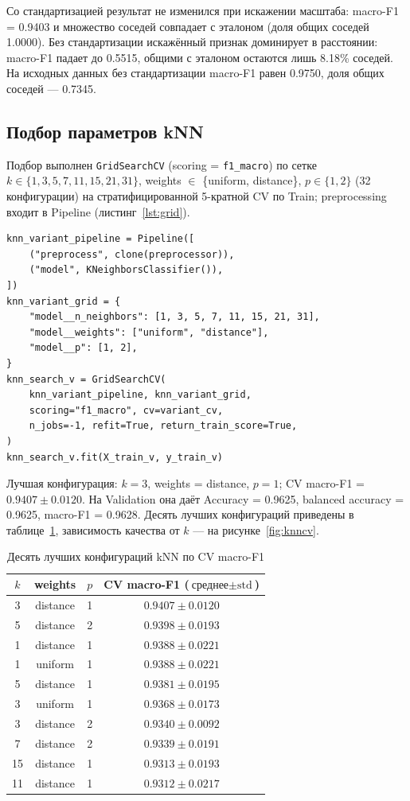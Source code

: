 \documentclass[14pt,a4paper]{extarticle}
\newcommand{\sd}{\ensuremath{\pm}}
\begin{document}
Со стандартизацией результат не изменился при искажении масштаба: macro-F1 = 0.9403 и множество соседей совпадает с эталоном (доля общих соседей 1.0000). Без стандартизации искажённый признак доминирует в расстоянии: macro-F1 падает до 0.5515, общими с эталоном остаются лишь 8.18\% соседей. На исходных данных без стандартизации macro-F1 равен 0.9750, доля общих соседей --- 0.7345.

\subsection{Подбор параметров kNN}

Подбор выполнен \texttt{GridSearchCV} (scoring = \texttt{f1\_macro}) по сетке $k\in\{1,3,5,7,11,15,21,31\}$, weights $\in$ \{uniform, distance\}, $p\in\{1,2\}$ (32 конфигурации) на стратифицированной 5-кратной CV по Train; preprocessing входит в Pipeline (листинг~\ref{lst:grid}).

\begin{lstlisting}[caption={Подбор параметров kNN в Pipeline},label={lst:grid}]
knn_variant_pipeline = Pipeline([
    ("preprocess", clone(preprocessor)),
    ("model", KNeighborsClassifier()),
])
knn_variant_grid = {
    "model__n_neighbors": [1, 3, 5, 7, 11, 15, 21, 31],
    "model__weights": ["uniform", "distance"],
    "model__p": [1, 2],
}
knn_search_v = GridSearchCV(
    knn_variant_pipeline, knn_variant_grid,
    scoring="f1_macro", cv=variant_cv,
    n_jobs=-1, refit=True, return_train_score=True,
)
knn_search_v.fit(X_train_v, y_train_v)
\end{lstlisting}

Лучшая конфигурация: $k=3$, weights = distance, $p=1$; CV macro-F1 = $0.9407\sd 0.0120$. На Validation она даёт Accuracy = 0.9625, balanced accuracy = 0.9625, macro-F1 = 0.9628. Десять лучших конфигураций приведены в таблице~\ref{tab:knn}, зависимость качества от $k$ --- на рисунке~\ref{fig:knncv}.

\begin{table}[h!]
\centering
\begin{tabular}{cccc}
\toprule
$k$ & weights & $p$ & CV macro-F1 ($\text{среднее}\sd\text{std}$) \\
\midrule
3  & distance & 1 & $0.9407\sd 0.0120$ \\
5  & distance & 2 & $0.9398\sd 0.0193$ \\
1  & distance & 1 & $0.9388\sd 0.0221$ \\
1  & uniform  & 1 & $0.9388\sd 0.0221$ \\
5  & distance & 1 & $0.9381\sd 0.0195$ \\
3  & uniform  & 1 & $0.9368\sd 0.0173$ \\
3  & distance & 2 & $0.9340\sd 0.0092$ \\
7  & distance & 2 & $0.9339\sd 0.0191$ \\
15 & distance & 1 & $0.9313\sd 0.0193$ \\
11 & distance & 1 & $0.9312\sd 0.0217$ \\
\bottomrule
\end{tabular}
\caption{Десять лучших конфигураций kNN по CV macro-F1}
\label{tab:knn}
\end{table}
\end{document}

